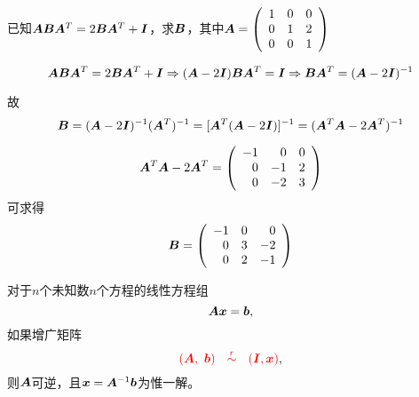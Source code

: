 \begin{li}
  已知$\A\B\A^T=2\B\A^T+\II$，求$\B$，其中$
  \A = \left(
    \begin{array}{ccc}
      1&0&0\\
      0&1&2\\
      0&0&1
    \end{array}
  \right)
  $
\end{li}
\begin{jie}
$$
\A\B\A^T=2\B\A^T+\II \Rightarrow (\A-2\II)\B\A^T=\II 
\Rightarrow \B\A^T = (\A-2\II)^{-1}
$$

故
$$
\B = (\A-2\II)^{-1} (\A^T)^{-1}  = [\A^T(\A-2\II)]^{-1} 
=(\A^T\A-2\A^T)^{-1}
$$

$$
\A^T\A-2\A^T = \left(
  \begin{array}{rrr}
    -1&0&0\\
    0&-1&2\\
    0&-2&3
  \end{array}
\right)
$$ 
可求得
$$
\B = \left(
  \begin{array}{rrr}
    -1&0&0\\
    0&3&-2\\
    0&2&-1
  \end{array}
\right)
$$
\end{jie}




\begin{tuilun}
  对于$n$个未知数$n$个方程的线性方程组
  $$
  \A\xx=\bb,
  $$
  如果增广矩阵
  $$
  \red{(\A,~\bb)~~\overset{r}{\sim}~~(\II,\xx)},
  $$
  则$\A$可逆，且$\xx=\A^{-1}\bb$为惟一解。  
\end{tuilun}


